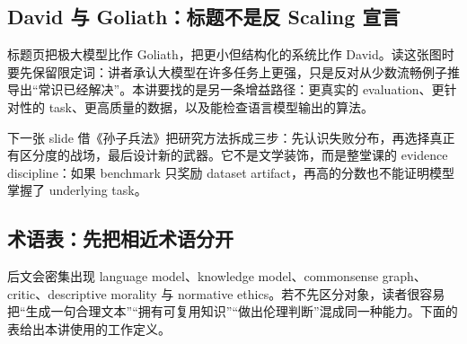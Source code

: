 \subsection{David 与 Goliath：标题不是反 Scaling 宣言}

标题页把极大模型比作 Goliath，把更小但结构化的系统比作 David。读这张图时要先保留限定词：讲者承认大模型在许多任务上更强，只是反对从少数流畅例子推导出“常识已经解决”。本讲要找的是另一条增益路径：更真实的 evaluation、更针对性的 task、更高质量的数据，以及能检查语言模型输出的算法。


下一张 slide 借《孙子兵法》把研究方法拆成三步：先认识失败分布，再选择真正有区分度的战场，最后设计新的武器。它不是文学装饰，而是整堂课的 evidence discipline：如果 benchmark 只奖励 dataset artifact，再高的分数也不能证明模型掌握了 underlying task。



\subsection{术语表：先把相近术语分开}

后文会密集出现 language model、knowledge model、commonsense graph、critic、descriptive morality 与 normative ethics。若不先区分对象，读者很容易把“生成一句合理文本”“拥有可复用知识”“做出伦理判断”混成同一种能力。下面的表给出本讲使用的工作定义。

